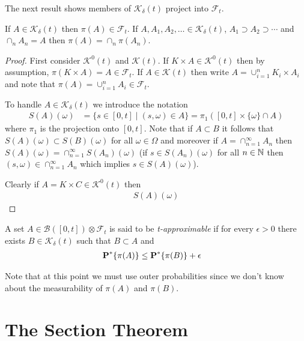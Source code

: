 The next result shows members of $\mathcal{K}_\delta(t)$ project into $\mathcal{F}_t$.
\begin{lem}\label{KDeltaProjection}If $A \in \mathcal{K}_\delta(t)$ then $\pi(A) \in \mathcal{F}_t$.  If $A, A_1, A_2, \dotsc \in \mathcal{K}_\delta(t)$, $A_1 \supset A_2 \supset \dotsb$ and $\cap_n A_n = A$ then $\pi(A) = \cap_n \pi(A_n)$.
\end{lem}
\begin{proof}
First consider $\mathcal{K}^0(t)$ and $\mathcal{K}(t)$.  If $K \times A \in \mathcal{K}^0(t)$ then by assumption, $\pi(K \times A) = A \in \mathcal{F}_t$.  If $A \in \mathcal{K}(t)$ then
write $A = \cup_{i=1}^n K_i \times A_i$ and note that $\pi(A) = \cup_{i=1}^n A_i \in \mathcal{F}_t$.  

To handle $A \in \mathcal{K}_\delta(t)$ we introduce the notation
\begin{align*}
S(A)(\omega) &= \lbrace s \in [0,t] \mid (s,\omega) \in A \rbrace = \pi_1 ([0,t] \times \lbrace \omega \rbrace \cap A)
\end{align*}
where $\pi_1$ is the projection onto $[0,t]$.  Note that if $A \subset B$ it follows that $S(A)(\omega) \subset S(B)(\omega)$ for all $\omega \in \Omega$ and moreover if $A = \cap_{n=1}^\infty A_n$ then $S(A)(\omega) = \cap_{n=1}^\infty S(A_n)(\omega)$ (if $s \in S(A_n)(\omega)$ for all $n \in \mathbb{N}$ then $(s, \omega) \in \cap_{n=1}^\infty A_n$ which implies $s \in S(A)(\omega)$).  

Clearly if $A = K \times C \in \mathcal{K}^0(t)$ then 
\begin{align*}
S(A)(\omega)
\end{align*}
\end{proof}

\begin{defn}A set $A \in \mathcal{B}([0,t]) \otimes \mathcal{F}_t$ is said to be \emph{t-approximable} if for every $\epsilon > 0$ there exists $B \in \mathcal{K}_\delta(t)$ such that $B \subset A$ and 
\begin{align*}
\textbf{P}^*\{\pi (A)\} &\leq \textbf{P}^*\{\pi(B)\} + \epsilon
\end{align*}
\end{defn}
Note that at this point we must use outer probabilities since we don't know about the measurability of $\pi(A)$ and $\pi(B)$.  

\section{The Section Theorem}

